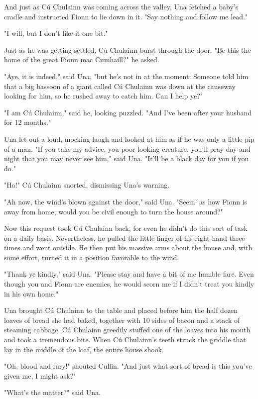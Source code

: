 And just as Cú Chulainn was coming across the valley, Una fetched a baby's cradle and instructed Fionn to lie down in it. "Say nothing and follow me lead."

"I will, but I don't like it one bit."

Just as he was getting settled, Cú Chulainn burst through the door. "Be this the home of the great Fionn mac Cumhaill?" he asked.

"Aye, it is indeed," said Una, "but he's not in at the moment. Someone told him that a big bassoon of a giant called Cú Chulainn was down at the causeway looking for him, so he rushed away to catch him. Can I help ye?"

"I am Cú Chulainn," said he, looking puzzled. "And I've been after your husband for 12 months."

Una let out a loud, mocking laugh and looked at him as if he was only a little pip of a man. "If you take my advice, you poor looking creature, you'll pray day and night that you may never see him," said Una. "It'll be a black day for you if you do."

"Ha!" Cú Chulainn snorted, dismissing Una's warning.

"Ah now, the wind's blown against the door," said Una. "Seein' as how Fionn is away from home, would you be civil enough to turn the house around?"

Now this request took Cú Chulainn back, for even he didn't do this sort of task on a daily basis. Nevertheless, he pulled the little finger of his right hand three times and went outside. He then put his massive arms about the house and, with some effort, turned it in a position favorable to the wind.

"Thank ye kindly," said Una. "Please stay and have a bit of me humble fare. Even though you and Fionn are enemies, he would scorn me if I didn't treat you kindly in his own home."

Una brought Cú Chulainn to the table and placed before him the half dozen loaves of bread she had baked, together with 10 sides of bacon and a stack of steaming cabbage. Cú Chulainn greedily stuffed one of the loaves into his mouth and took a tremendous bite. When Cú Chulainn's teeth struck the griddle that lay in the middle of the loaf, the entire house shook.

"Oh, blood and fury!" shouted Cullin. "And just what sort of bread is this you've given me, I might ask?"

"What's the matter?" said Una.

